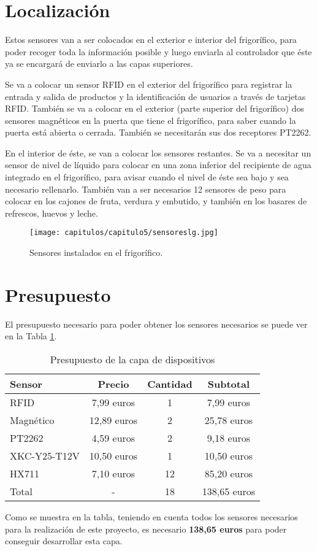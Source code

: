 \section{Localización}

Estos sensores van a ser colocados en el exterior e interior del frigorífico, para poder recoger toda la información posible y luego enviarla al controlador que éste ya se encargará de enviarlo a las capas superiores.

Se va a colocar un sensor RFID en el exterior del frigorífico para registrar la entrada y salida de productos y la identificación de usuarios a través de tarjetas RFID. También se va a colocar en el exterior (parte superior del frigorífico) dos sensores magnéticos en la puerta que tiene el frigorífico, para saber cuando la puerta está abierta o cerrada. También se necesitarán sus dos receptores PT2262.

En el interior de éste, se van a colocar los sensores restantes. Se va a necesitar un sensor de nivel de líquido para colocar en una zona inferior del recipiente de agua integrado en el frigorífico, para avisar cuando el nivel de éste sea bajo y sea necesario rellenarlo. También van a ser necesarios 12 sensores de peso para colocar en los cajones de fruta, verdura y embutido, y también en los basares de refrescos, huevos y leche.

\begin{figure}[h] 
    \centering
    \texttt{[image: capitulos/capitulo5/sensoreslg.jpg]}
    \caption{Sensores instalados en el frigorífico.}
    \label{fig:sensoreslg}
\end{figure}

\section{Presupuesto}
El presupuesto necesario para poder obtener los sensores necesarios se puede ver en la Tabla \ref{tab:presupuesto}.

\begin{table}[h]
    \centering
    \begin{tabular}{|l|c|c|c|}
        \rowcolor[gray]{.5}
        \hline
            \color{white}Sensor&\color{white}Precio&\color{white}Cantidad&\color{white}Subtotal  \\
        \hline
            RFID&7,99 euros &1&7,99 euros  \\
        \hline    
            Magnético&12,89 euros &2&25,78 euros  \\
        \hline    
            PT2262&4,59 euros &2&9,18 euros  \\
        \hline    
            XKC-Y25-T12V&10,50 euros &1&10,50 euros  \\
        \hline    
            HX711&7,10 euros &12&85,20 euros  \\
        \hline    
        \rowcolor[gray]{.9}
         \hline
            Total&-&18&138,65 euros  \\
        \hline
    \end{tabular}
    \caption{Presupuesto de la capa de dispositivos}
    \label{tab:presupuesto}
\end{table}

Como se muestra en la tabla, teniendo en cuenta todos los sensores necesarios para la realización de este proyecto, es necesario \textbf{138,65 euros} para poder conseguir desarrollar esta capa.